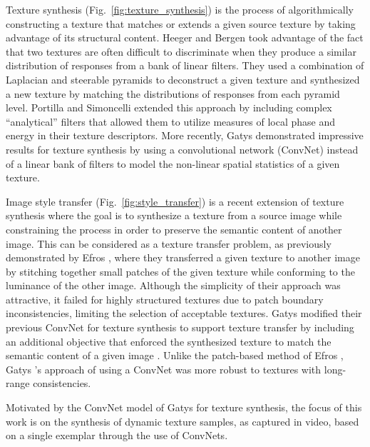 

Texture synthesis (Fig.\ \ref{fig:texture_synthesis}) is the process of algorithmically constructing a texture that
matches or extends a given source texture by taking advantage of its structural 
content. Heeger and Bergen \cite{heeger1995pyramid} took advantage of the fact 
that two textures are often difficult to discriminate when they produce a similar 
distribution of responses from a bank of linear filters. They used a combination 
of Laplacian and steerable pyramids to deconstruct a given texture and 
synthesized a new texture by matching the distributions of responses from each
pyramid level. Portilla and Simoncelli \cite{portilla2000parametric} extended this approach by including complex ``analytical'' filters that allowed them to utilize measures of local phase and energy in their texture descriptors. More recently, Gatys \etal \cite{gatys2015} demonstrated 
impressive results for texture synthesis by using a convolutional network (ConvNet) instead of a linear 
bank of filters to model the non-linear spatial statistics of a given texture.



Image style transfer (Fig.\ \ref{fig:style_transfer}) is a recent extension of texture synthesis where the goal is to 
synthesize a texture from a source image while constraining the process in order 
to preserve the semantic content of another image. This can be considered as a 
texture transfer problem, as previously demonstrated by Efros \etal \cite{efros2001image}, where they transferred a given texture to another image by stitching together small patches of the given texture while conforming to the luminance of the other image. Although the simplicity of their approach was attractive, it failed for highly structured textures due to patch boundary inconsistencies, limiting the selection of acceptable textures. 
Gatys \etal modified their previous ConvNet for texture synthesis \cite{gatys2015} to support texture transfer by including an additional objective that enforced the synthesized texture to match the semantic content of a given image \cite{gatys2016image}. Unlike the patch-based method of Efros \etal \cite{efros2001image}, Gatys \etal's approach of using a ConvNet was more robust to textures with long-range consistencies.

Motivated by the ConvNet model of Gatys \etal \cite{gatys2016image} for texture synthesis, the focus of this work is on the synthesis of dynamic texture 
samples, as captured in video, based on a single exemplar through the use of ConvNets.
\clearpage

\clearpage

